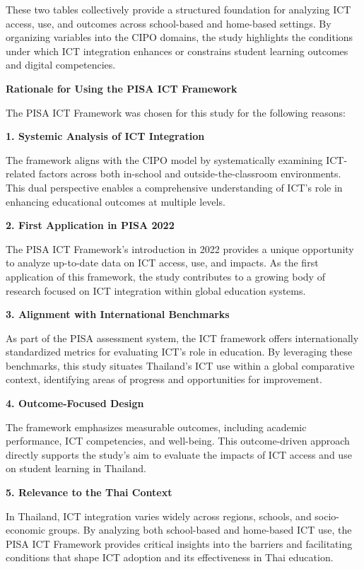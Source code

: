 \documentclass[
]{article}
\begin{document}
These two tables collectively provide a structured foundation for
analyzing ICT access, use, and outcomes across school-based and
home-based settings. By organizing variables into the CIPO domains, the
study highlights the conditions under which ICT integration enhances or
constrains student learning outcomes and digital competencies.

\textbf{Rationale for Using the PISA ICT Framework}

The PISA ICT Framework was chosen for this study for the following
reasons:

\textbf{1. Systemic Analysis of ICT Integration}

The framework aligns with the CIPO model by systematically examining
ICT-related factors across both in-school and outside-the-classroom
environments. This dual perspective enables a comprehensive
understanding of ICT's role in enhancing educational outcomes at
multiple levels.

\textbf{2. First Application in PISA 2022}

The PISA ICT Framework's introduction in 2022 provides a unique
opportunity to analyze up-to-date data on ICT access, use, and impacts.
As the first application of this framework, the study contributes to a
growing body of research focused on ICT integration within global
education systems.

\textbf{3. Alignment with International Benchmarks}

As part of the PISA assessment system, the ICT framework offers
internationally standardized metrics for evaluating ICT's role in
education. By leveraging these benchmarks, this study situates
Thailand's ICT use within a global comparative context, identifying
areas of progress and opportunities for improvement.

\textbf{4. Outcome-Focused Design}

The framework emphasizes measurable outcomes, including academic
performance, ICT competencies, and well-being. This outcome-driven
approach directly supports the study's aim to evaluate the impacts of
ICT access and use on student learning in Thailand.

\textbf{5. Relevance to the Thai Context}

In Thailand, ICT integration varies widely across regions, schools, and
socio-economic groups. By analyzing both school-based and home-based ICT
use, the PISA ICT Framework provides critical insights into the barriers
and facilitating conditions that shape ICT adoption and its
effectiveness in Thai education.
\end{document}
